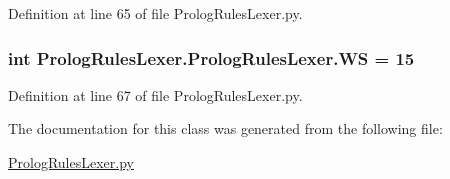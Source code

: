 Definition at line 65 of file Prolog\+Rules\+Lexer.\+py.

\hypertarget{class_prolog_rules_lexer_1_1_prolog_rules_lexer_a523e5f38e4d90961b74632dbfb8dee04}{}
\subsubsection[{W\+S}]{\setlength{\rightskip}{0pt plus 5cm}int Prolog\+Rules\+Lexer.\+Prolog\+Rules\+Lexer.\+W\+S = 15\hspace{0.3cm}{\ttfamily [static]}}\label{class_prolog_rules_lexer_1_1_prolog_rules_lexer_a523e5f38e4d90961b74632dbfb8dee04}


Definition at line 67 of file Prolog\+Rules\+Lexer.\+py.



The documentation for this class was generated from the following file\+:\begin{DoxyCompactItemize}
\item 
\hyperlink{_prolog_rules_lexer_8py}{Prolog\+Rules\+Lexer.\+py}\end{DoxyCompactItemize}
